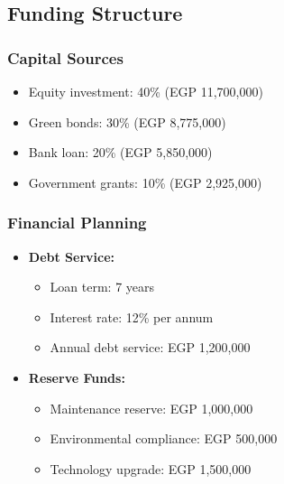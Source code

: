 \subsection{Funding Structure}

\subsubsection{Capital Sources}
\begin{itemize}
    \item Equity investment: 40\% (EGP 11,700,000)
    \item Green bonds: 30\% (EGP 8,775,000)
    \item Bank loan: 20\% (EGP 5,850,000)
    \item Government grants: 10\% (EGP 2,925,000)
\end{itemize}

\subsubsection{Financial Planning}
\begin{itemize}
    \item \textbf{Debt Service:}
    \begin{itemize}
        \item Loan term: 7 years
        \item Interest rate: 12\% per annum
        \item Annual debt service: EGP 1,200,000
    \end{itemize}
    
    \item \textbf{Reserve Funds:}
    \begin{itemize}
        \item Maintenance reserve: EGP 1,000,000
        \item Environmental compliance: EGP 500,000
        \item Technology upgrade: EGP 1,500,000
    \end{itemize}
\end{itemize}
